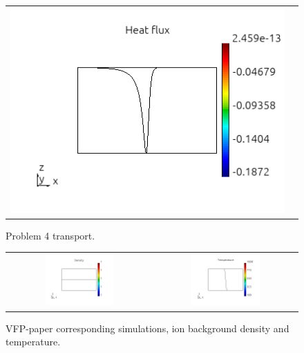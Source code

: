 \documentclass[review]{elsarticle}
\begin{document}
\begin{figure}[tbh]
\begin{center}
\begin{tabular}{cc}
      \includegraphics[width=\psize\textwidth]{figs/hflux_p41D1e2.png} 
    \end{tabular}
  \caption{
    Problem 4 transport.
  }
  \end{center}
  \label{fig:p4_Kn_hflux}
\end{figure}

\begin{figure}[tbh]
  \begin{center}
    \begin{tabular}{cc}
      \includegraphics[width=0.5\textwidth]{figs/density_p51D.png} &
      \includegraphics[width=0.5\textwidth]{figs/temperature_p51D.png}
    \end{tabular}
  \caption{
	VFP-paper corresponding simulations, ion background density and 
	temperature.
  }
  \end{center}
  \label{fig:p51D_rho_T}
\end{figure}
\end{document}
